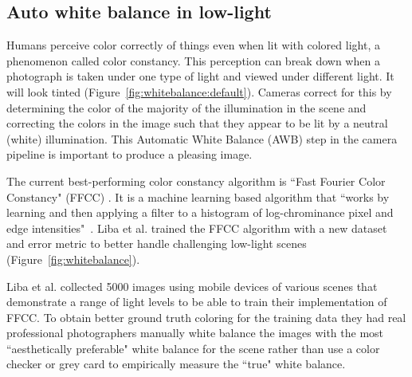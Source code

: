 \documentclass{sig-alternate}
\begin{document}



\subsection{Auto white balance in low-light}
\label{sec:autoWhiteBal}

Humans perceive color correctly of things even when lit with colored light, a phenomenon called color constancy. This perception can break down when a photograph is taken under one type of light and viewed under different light. It will look tinted (Figure~\ref{fig:whitebalance:default}).
Cameras correct for this by determining the color of the majority of the illumination in the scene and correcting the colors in the image such that they appear to be lit by a neutral (white) illumination. 
This Automatic White Balance (AWB) step in the camera pipeline is important to produce a pleasing image. \cite{Liba2019, blog:Levoy2018}

The current best-performing color constancy algorithm is ``Fast Fourier Color Constancy" (FFCC) \cite{Barron2017}. It is a machine learning based algorithm that ``works by learning and then applying a filter to a histogram of log-chrominance pixel and edge intensities"~\cite{Liba2019}. Liba et al. trained the FFCC algorithm with a new dataset and error metric to better handle challenging low-light scenes (Figure~\ref{fig:whitebalance}).

Liba et al. collected 5000 images using mobile devices of various scenes that demonstrate a range of light levels to be able to train their implementation of FFCC. To obtain better ground truth coloring for the training data they had real professional photographers manually white balance the images with the most ``aesthetically preferable" white balance for the scene rather than use a color checker or grey card to empirically measure the ``true" white balance.~\cite{Liba2019}
\end{document}
